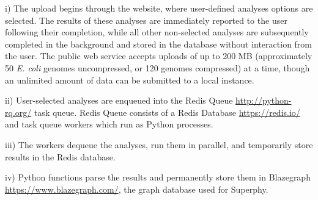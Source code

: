 \documentclass{article}
\begin{document}
i) The upload begins through the website, where user-defined analyses options are selected. The results of these analyses are immediately reported to the user following their completion, while all other non-selected analyses are subsequently completed in the background and stored in the database without interaction from the user. The public web service accepts uploads of up to 200 MB (approximately 50 \textit {E. coli} genomes uncompressed, or 120 genomes compressed) at a time, though an unlimited amount of data can be submitted to a local instance.

ii) User-selected analyses are enqueued into the Redis Queue \url{http://python-rq.org/} task queue. Redis Queue consists of a Redis Database \url{https://redis.io/} and task queue workers which run as Python processes.

iii) The workers dequeue the analyses, run them in parallel, and temporarily store results in the Redis database.

iv) Python functions parse the results and permanently store them in Blazegraph \url{https://www.blazegraph.com/}, the graph database used for Superphy.
\end{document}
